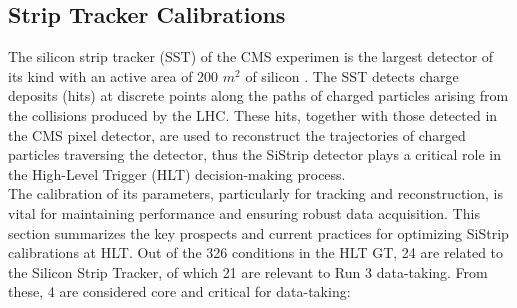 \subsection{Strip Tracker Calibrations}

The silicon strip tracker (SST) of the CMS experimen is the largest
detector of its kind with an active area of 200 $m^{2}$ of silicon \cite{Karimaki:368412,CERN-LHCC-2000-016,Adam_2021}. The SST detects charge deposits (hits) at discrete points along the paths of charged particles arising from the collisions produced by the LHC. These hits, together with those detected in the CMS pixel detector, are used to reconstruct the trajectories of charged particles traversing the detector, thus the SiStrip detector plays a critical role in the High-Level Trigger (HLT) decision-making process.\\
 The calibration of its parameters, particularly for tracking and reconstruction, is vital for maintaining performance and ensuring robust data acquisition. This section summarizes the key prospects and current practices for optimizing SiStrip calibrations at HLT.\newline \newline
Out of the 326 conditions in the HLT GT, 24 are related to the Silicon Strip Tracker, of which 21 are relevant to Run 3 data-taking. From these, 4 are considered core and critical for data-taking:

